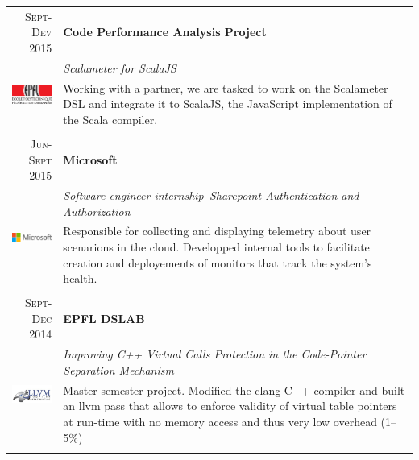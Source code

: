 \documentclass[a4paper,11pt]{article} %
\begin{document}
\begin{tabularx}{\textwidth}{r|X}

\textsc{Sept-Dev 2015} & \textbf{Code Performance Analysis Project} \\
\multirow{3}{*}{ \includegraphics[width=60pt]{img/epfl.eps}}
& \emph{Scalameter for ScalaJS}\\ 
& \footnotesize{Working with a partner, we are tasked to work on the Scalameter
DSL and integrate it to ScalaJS,
the JavaScript implementation of the Scala compiler.}\\
\multicolumn{2}{c}{} \\


\textsc{Jun-Sept 2015} & \textbf{Microsoft} \\
\multirow{2}{*}{ \includegraphics[width=60pt]{img/microsoft.eps}}
& \emph{Software engineer internship--Sharepoint Authentication and Authorization}\\ 
& \footnotesize{Responsible for collecting and displaying telemetry about user
scenarions in the cloud. Developped internal tools to facilitate creation and deployements
of monitors that track the system's health.}\\
\multicolumn{2}{c}{} \\


\textsc{Sept-Dec 2014} & \textbf{EPFL DSLAB} \\
\multirow{2}{*}{ \includegraphics[width=60pt]{img/llvm.eps}}
& \emph{Improving C++ Virtual Calls Protection in the Code-Pointer Separation Mechanism}\\ 
& \footnotesize{Master semester project. Modified the clang C++ compiler and
built an llvm pass that allows to enforce validity of virtual table pointers at
run-time with no memory access and thus very low overhead (1--5\%)}\\
\multicolumn{2}{c}{} \\



\end{tabularx}
\end{document}
